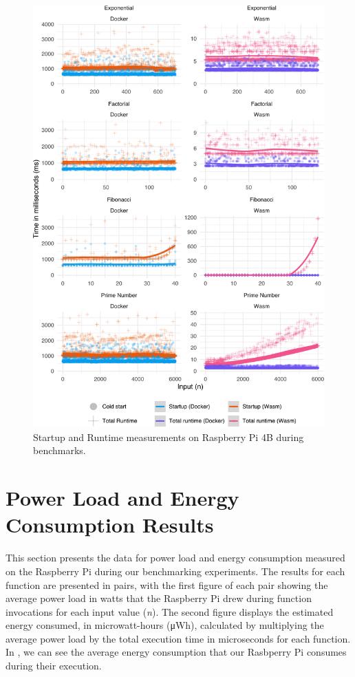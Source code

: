 \documentclass[
  table]{report}
\begin{document}
\begin{figure}[H]

{\centering \includegraphics{thesis_files/figure-latex/rpi-efficiency-1} 

}

\caption{Startup and Runtime measurements on Raspberry Pi 4B during benchmarks.}\label{fig:rpi-efficiency}
\end{figure}

\newpage

\section{Power Load and Energy Consumption Results}

This section presents the data for power load and energy consumption
measured on the Raspberry Pi during our benchmarking experiments. The
results for each function are presented in pairs, with the first figure
of each pair showing the average power load in watts that the Raspberry
Pi drew during function invocations for each input value (\emph{n}). The
second figure displays the estimated energy consumed, in microwatt-hours
(μWh), calculated by multiplying the average power load by the total
execution time in microseconds for each function. In
, we can see the average energy
consumption that our Rasbperry Pi consumes during their execution.
\end{document}
